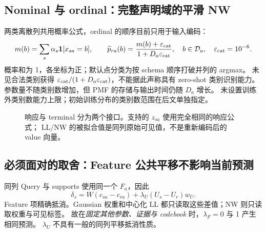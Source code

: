 \documentclass[11pt,UTF8,fontset=fandol]{ctexart}
\newcommand{\R}{\mathbb R}\newcommand{\V}{\mathcal V}\newcommand{\Q}{\mathcal Q}
\begin{document}
\subsection{Nominal 与 ordinal：完整声明域的平滑 NW}
两类离散列共用概率公式，ordinal 的顺序目前只用于输入编码：
\begin{equation}
 m(b)=\sum_s\alpha_s\mathbf 1[x_{sa}=b],\qquad
 \widehat p_{ra}(b)=\frac{m(b)+\varepsilon_{\rm cat}}{1+D_a\varepsilon_{\rm cat}},
 \quad b\in\mathcal D_a,\quad\varepsilon_{\rm cat}=10^{-6}.
 \label{eq:pmf}
\end{equation}
概率和为 1，各坐标为正；默认点分类为按 schema 顺序打破并列的 argmax。
未见合法类别获得 $\varepsilon_{\rm cat}/(1+D_a\varepsilon_{\rm cat})$，不能据此声称具有 zero-shot 类别识别能力。
参数量不随类别数增加，但 PMF 的存储与输出时间仍随 $D_a$ 增长。
未设置训练外类别数能力上限；初始训练分布的类别数范围在后文单独指定。

\begin{figure}[htbp]\centering
{}
\caption{响应与 terminal 分为两个接口。支持的 $z_{sa}$ 使用完全相同的响应公式；
LL/NW 的被拟合值是同列原始可见值，不是重新编码后的 value 向量。}
\label{fig:readout}
\end{figure}

\subsection{必须面对的取舍：Feature 公共平移不影响当前预测}
同列 Query 与 supports 使用同一个 $F_a$，因此
\begin{equation}
 \delta_s=W(c_{sa}-c_{ra})+\lambda_U(U_s-U_r)w_U.
 \label{eq:translation}
\end{equation}
Feature 项精确抵消。Gaussian 权重和中心化 LL 都只读取这些差值；NW 则只读取权重与可见标签。
故在\emph{固定其他参数、证据与 codebook} 时，$\lambda_F=0$ 与 1 产生相同预测。
$\lambda_U$ 不具有一般的同列平移抵消性质。
\end{document}
